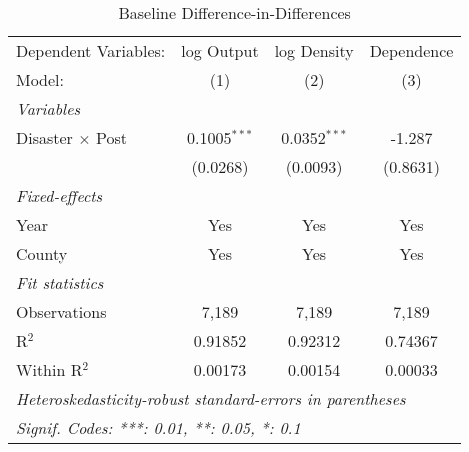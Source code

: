 
\begin{table}[htbp]
   \caption{Baseline Difference-in-Differences}
   \centering
   \begin{adjustbox}{max width = \textwidth, center}
      \begin{tabular}{lccc}
         \tabularnewline \midrule \midrule
         Dependent Variables:    & log Output     & log Density    & Dependence\\  
         Model:                  & (1)            & (2)            & (3)\\  
         \midrule
         \emph{Variables}\\
         Disaster $\times$ Post  & 0.1005$^{***}$ & 0.0352$^{***}$ & -1.287\\   
                                 & (0.0268)       & (0.0093)       & (0.8631)\\   
         \midrule
         \emph{Fixed-effects}\\
         Year                    & Yes            & Yes            & Yes\\  
         County                  & Yes            & Yes            & Yes\\  
         \midrule
         \emph{Fit statistics}\\
         Observations            & 7,189          & 7,189          & 7,189\\  
         R$^2$                   & 0.91852        & 0.92312        & 0.74367\\  
         Within R$^2$            & 0.00173        & 0.00154        & 0.00033\\  
         \midrule \midrule
         \multicolumn{4}{l}{\emph{Heteroskedasticity-robust standard-errors in parentheses}}\\
         \multicolumn{4}{l}{\emph{Signif. Codes: ***: 0.01, **: 0.05, *: 0.1}}\\
      \end{tabular}
   \end{adjustbox}
\end{table}


